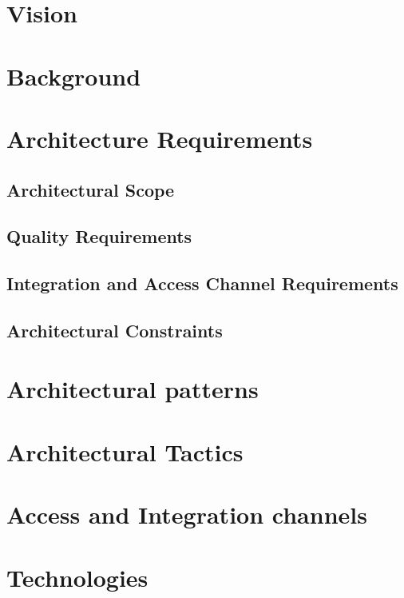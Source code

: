 \documentclass[hidelinks,a4paper,12pt]{article}
\begin{document}
	\section{Vision}%
	
	
	\section{Background} %

	\newpage
	
	\section{Architecture Requirements}%
	\subsection{Architectural Scope}%
	\subsection{Quality Requirements}%
	\subsection{Integration and Access Channel Requirements}%
	\subsection{Architectural Constraints }%
	\section{Architectural patterns}%
	\section{Architectural Tactics}%
	\section{Access and Integration channels}%
	\section{Technologies}%
	
	
	
	
	
	
\end{document}
